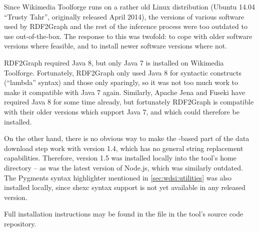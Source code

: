 Since \gls{Wikimedia Toolforge} runs on a rather old Linux distribution
(Ubuntu 14.04 “Trusty Tahr”, originally released April 2014),
the versions of various software used by \gls{RDF2Graph} and the rest of the inference process
were too outdated to use out-of-the-box.
The response to this was twofold:
to cope with older software versions where feasible,
and to install newer software versions where not.

\Gls{RDF2Graph} required \gls{Java} 8,
but only \gls{Java} 7 is installed on \gls{Wikimedia Toolforge}.
Fortunately, \gls{RDF2Graph} only used \gls{Java} 8 for syntactic constructs (“lambda” syntax)
and those only sparingly, so it was not too much work to make it compatible with \gls{Java} 7 again.
Similarly, Apache Jena and Fuseki have required \gls{Java} 8 for some time already,
but fortunately \gls{RDF2Graph} is compatible with their older versions which support \gls{Java} 7,
and which could therefore be installed.

On the other hand, there is no obvious way to make the -based part of the data download step
work with  version 1.4, which has no general string replacement capabilities.
Therefore,  version 1.5 was installed locally into the tool’s home directory –
as was the latest version of \gls{Node.js}, which was similarly outdated.
The Pygments syntax highlighter mentioned in \cref{sec:wdsi:utilities} was also installed locally,
since \gls{shexc} syntax support is not yet available in any released version.

Full installation instructions may be found in the  file
in the tool’s source code repository.

